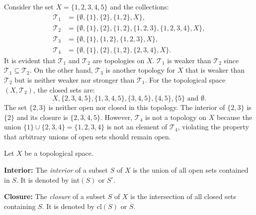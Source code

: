 \begin{example}
    Consider the set \( X = \{1,2,3,4,5\} \) and the collections:
    \begin{align*}
    \mathcal{T}_1 &= \{\emptyset, \{1\}, \{2\}, \{1,2\}, X\}, \\
    \mathcal{T}_2 &= \{\emptyset, \{1\}, \{2\}, \{1,2\}, \{1,2,3\}, \{1,2,3,4\}, X\}, \\
    \mathcal{T}_3 &= \{\emptyset, \{1\}, \{1,2\}, \{1,2,3\}, X\}, \\
    \mathcal{T}_4 &= \{\emptyset, \{1\}, \{2\}, \{1,2\}, \{2,3,4\}, X\}.
    \end{align*}
    It is evident that \( \mathcal{T}_1 \) and \( \mathcal{T}_2 \) are topologies on \( X \). \( \mathcal{T}_1 \) is weaker than \( \mathcal{T}_2 \) since \( \mathcal{T}_1 \subseteq \mathcal{T}_2 \). On the other hand, \( \mathcal{T}_3 \) is another topology for \( X \) that is weaker than \( \mathcal{T}_2 \) but is neither weaker nor stronger than \( \mathcal{T}_1 \).
    For the topological space \( (X, \mathcal{T}_2) \), the closed sets are:
    \[ X, \{2,3,4,5\}, \{1,3,4,5\}, \{3,4,5\}, \{4,5\}, \{5\} \text{ and } \emptyset. \]
    The set \( \{2, 3\} \) is neither open nor closed in this topology. The interior of \( \{2, 3\} \) is \( \{2\} \) and its closure is \( \{2, 3, 4, 5\} \).
    However, \( \mathcal{T}_4 \) is not a topology on \( X \) because the union \( \{1\} \cup \{2,3,4\} = \{1,2,3,4\} \) is not an element of \( \mathcal{T}_4 \), violating the property that arbitrary unions of open sets should remain open.
\end{example}

\begin{definition}
    Let \( X \) be a topological space. 
    \item \textbf{Interior:} The \textit{interior} of a subset \( S \) of \( X \) is the union of all open sets contained in \( S \). It is denoted by \(\text{int}(S)\) or \(S^\circ\).
    
    \item \textbf{Closure:} The \textit{closure} of a subset \( S \) of \( X \) is the intersection of all closed sets containing \( S \). It is denoted by \(\text{cl}(S)\) or \(\overline{S}\).
\end{definition}



